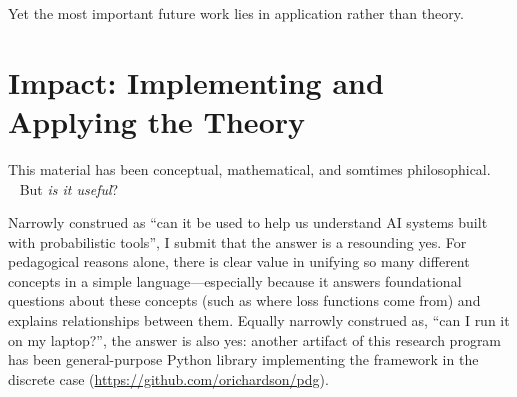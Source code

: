 Yet the most important future work lies in application rather than theory.

\section{Impact: Implementing and Applying the Theory}

This material has been conceptual, mathematical, and somtimes philosophical.
\\~\hfil
But \emph{is it useful}?
\hfil\par

Narrowly construed as ``can it be used to help us understand AI systems built with probabilistic tools'', I submit that the answer is a resounding yes. 
For pedagogical reasons alone, there is clear value in unifying so many different concepts 
in a simple language---especially 
    because it answers foundational questions about these concepts (such as where loss functions come from) and explains relationships between them.
Equally narrowly construed as, ``can I run it on my laptop?'', the answer is also yes:
\commentout{%
}%
another artifact of this research program has been general-purpose Python library implementing the framework in the discrete case
(\url{https://github.com/orichardson/pdg}).
